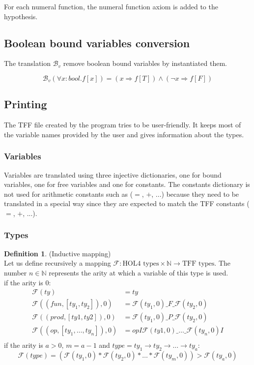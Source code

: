 \documentclass[a4paper, 11pt]{article}
\theoremstyle{plain}
\theoremstyle{definition}
\newtheorem*{mydef}{Definition}
\theoremstyle{remark}
\begin{document}
\noindent For each numeral function, the numeral function axiom is added to the hypothesis. 

\subsection{Boolean bound variables conversion} 
The translation $\mathcal{B}_v$ remove boolean bound variables by instantiated them.

\[\mathcal{B}_v (\forall x:bool . f[x]) = (x \Rightarrow f[T] ) \wedge
(\neg x \Rightarrow f[F])\] 


\subsection{Printing}
The TFF file created by the program tries to be user-friendly. It keeps most of the variable names provided by the user and gives information about the types.

\subsubsection{Variables}
Variables are translated using three injective dictionaries, one for bound variables, one for free variables and one for constants.
The constants dictionary is not used for arithmetic constants such as ($=$, $+$, ...) because they need to be translated in a special way since they are expected to match the TFF constants ($=$, $+$, ...).

\subsubsection{Types}
\begin{mydef} (Inductive mapping)
\\Let us define recursively a mapping $\mathcal{F} : \mbox{HOL4 types} \times \mathbb{N} \rightarrow \mbox{TFF types}$. The number $n\in \mathbb{N}$ represents the arity at which a variable of this type is used.
\\if the arity is $0$:
\[\begin{aligned}
\mathcal{F}(ty) &= ty\\
\mathcal{F}((fun,[ty_1,ty_2]),0) &= 
  \mathcal{F}(ty_1,0)\_F\_\mathcal{F}(ty_2,0)\\
\mathcal{F}((prod,[ty1,ty2]),0) &= 
   \mathcal{F}(ty_1,0)\_P\_\mathcal{F}(ty_2,0)\\
 \mathcal{F}((op,[ty_1,\ldots,ty_n]),0) &= 
   opI\mathcal{F}(ty1,0)\_\ldots\_\mathcal{F}(ty_n,0)I\\
\end{aligned}\]
if the arity is $a > 0$, $m = a-1$ and 
$type = ty_1 \rightarrow ty_2 \rightarrow \ldots \rightarrow ty_a$:
\[\mathcal{F}(type) = (\mathcal{F}(ty_1,0) * \mathcal{F}(ty_2,0) * \ldots * \mathcal{F}(ty_m,0)) > \mathcal{F}(ty_a,0) \]
\end{mydef}
\end{document}
